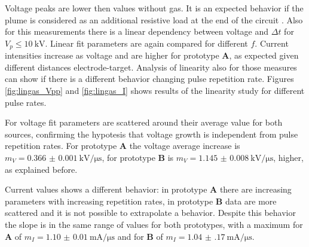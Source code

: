 Voltage peaks are lower then values without gas. It is an expected behavior if the plume is considered as an additional resistive load at the end of the circuit \cite{lieberman1994principles}. Also for this measurements there is a linear dependency between voltage and $\Delta t$ for $V_{p} \le \SI{10}{\kilo\volt}$. Linear fit parameters are again compared for different $f$. Current intensities increase as voltage and are higher for prototype \textbf{A}, as expected given different distances electrode-target. Analysis of linearity also for those measures can show if there is a different behavior changing pulse repetition rate.
Figures \ref{fig:lingas_Vpp} and \ref{fig:lingas_I} shows results of the linearity study for different pulse rates.

For voltage fit parameters are scattered around their average value for both sources, confirming the hypotesis that voltage growth is independent from pulse repetition rates. For prototype \textbf{A} the voltage average increase is $m_{V} = \SI{0.366(1)}{\kilo\volt/\micro\second}$, for prototype \textbf{B} is $m_{V} = \SI{1.145(8)}{\kilo\volt/\micro\second}$, higher, as explained before.

Current values shows a different behavior: in prototype \textbf{A} there are increasing parameters with increasing repetition rates, in prototype \textbf{B} data are more scattered and it is not possible to extrapolate a behavior. Despite this behavior the slope is in the same range of values for both prototypes, with a maximum for \textbf{A} of $m_{I} = \SI{1.10(1)}{\milli\ampere/\micro\second}$ and for \textbf{B} of $m_{I} = \SI{1.04(17)}{\milli\ampere/\micro\second}$.

